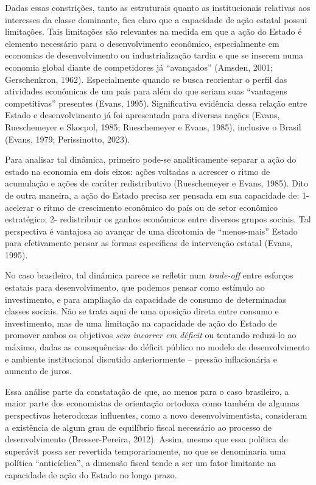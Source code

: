 Dadas essas constrições, tanto as estruturais quanto as institucionais
relativas aos interesses da classe dominante, fica claro que a
capacidade de ação estatal possui limitações. Tais limitações são
relevantes na medida em que a ação do Estado é elemento necessário para
o desenvolvimento econômico, especialmente em economias de
desenvolvimento ou industrialização tardia e que se inserem numa
economia global diante de competidores já ``avançados'' (Amsden, 2001;
Gerschenkron, 1962). Especialmente quando se busca reorientar o perfil
das atividades econômicas de um país para além do que seriam suas
``vantagens competitivas'' presentes (Evans, 1995). Significativa
evidência dessa relação entre Estado e desenvolvimento já foi
apresentada para diversas nações (Evans, Rueschemeyer e Skocpol, 1985;
Rueschemeyer e Evans, 1985), inclusive o Brasil (Evans, 1979;
Perissinotto, 2023).

Para analisar tal dinâmica, primeiro pode-se analiticamente separar a
ação do estado na economia em dois eixos: ações voltadas a acrescer o
ritmo de acumulação e ações de caráter redistributivo (Rueschemeyer e
Evans, 1985). Dito de outra maneira, a ação do Estado precisa ser
pensada em sua capacidade de: 1- acelerar o ritmo de crescimento
econômico do país ou de setor econômico estratégico; 2- redistribuir os
ganhos econômicos entre diversos grupos sociais. Tal perspectiva é
vantajosa ao avançar de uma dicotomia de ``menos-mais'' Estado para
efetivamente pensar as formas específicas de intervenção estatal (Evans,
1995).

No caso brasileiro, tal dinâmica parece se refletir num \emph{trade-off}
entre esforços estatais para desenvolvimento, que podemos pensar como
estímulo ao investimento, e para ampliação da capacidade de consumo de
determinadas classes sociais. Não se trata aqui de uma oposição direta
entre consumo e investimento, mas de uma limitação na capacidade de ação
do Estado de promover ambos os objetivos \emph{sem incorrer em déficit}
ou tentando reduzi-lo ao máximo, dadas as consequências do déficit
público no modelo de desenvolvimento e ambiente institucional discutido
anteriormente -- pressão inflacionária e aumento de juros.

Essa análise parte da constatação de que, ao menos para o caso
brasileiro, a maior parte dos economistas de orientação ortodoxa como
também de algumas perspectivas heterodoxas influentes, como a novo
desenvolvimentista, consideram a existência de algum grau de equilíbrio
fiscal necessário ao processo de desenvolvimento (Bresser-Pereira,
2012). Assim, mesmo que essa política de superávit possa ser revertida
temporariamente, no que se denominaria uma política ``anticíclica'', a
dimensão fiscal tende a ser um fator limitante na capacidade de ação do
Estado no longo prazo.

